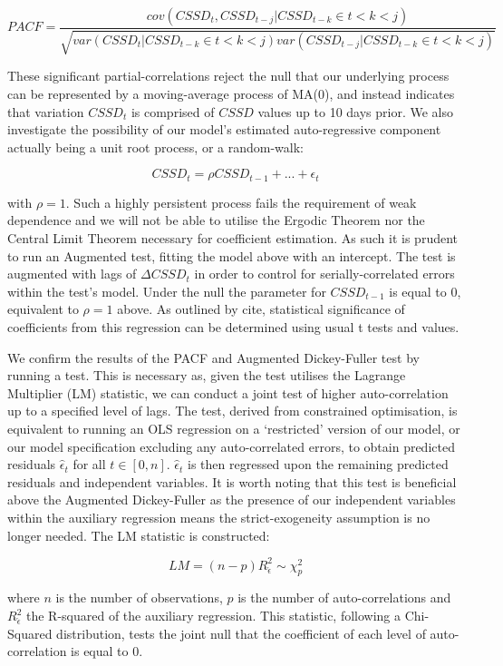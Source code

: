 \documentclass[12pt]{article}
\begin{document}
$$
PACF=\frac{cov(CSSD_t,CSSD_{t-j}|CSSD_{t-k}\in{t<k<j})}{\sqrt{var(CSSD_t|CSSD_{t-k}\in{t<k<j})var(CSSD_{t-j}|CSSD_{t-k}\in{t<k<j})}}
$$

These significant partial-correlations reject the null that our underlying process can be represented by a moving-average process of MA(0), and instead indicates that variation $CSSD_t$ is comprised of $CSSD$ values up to 10 days prior. We also investigate the possibility of our model’s estimated auto-regressive component actually being a unit root process, or a random-walk:

$$
CSSD_t=\rho{CSSD_{t-1}}+...+\epsilon_t
$$

with $\rho=1$. Such a highly persistent process fails the requirement of weak dependence and we will not be able to utilise the Ergodic Theorem nor the Central Limit Theorem necessary for coefficient estimation. As such it is prudent to run an Augmented \citet{dfuller} test, fitting the model above with an intercept. The test is augmented with lags of $\Delta{CSSD_t}$ in order to control for serially-correlated errors within the test’s model. Under the null the parameter for $CSSD_{t-1}$ is equal to 0, equivalent to $\rho=1$ above. As outlined by cite, statistical significance of coefficients from this regression can be determined using usual t tests and values.

We confirm the results of the PACF and Augmented Dickey-Fuller test by running a \citet{breusch} \citet{godfrey} test. This is necessary as, given the test utilises the Lagrange Multiplier (LM) statistic, we can conduct a joint test of higher auto-correlation up to a specified level of lags. The test, derived from constrained optimisation, is equivalent to running an OLS regression on a ‘restricted’ version of our model, or our model specification excluding any auto-correlated errors, to obtain predicted residuals $\hat{\epsilon}_t$ for all $t\in[0,n]$. $\hat{\epsilon}_t$ is then regressed upon the remaining predicted residuals and independent variables. It is worth noting that this test is beneficial above the Augmented Dickey-Fuller as the presence of our independent variables within the auxiliary regression means the strict-exogeneity assumption is no longer needed. The LM statistic is constructed:

$$
LM=(n-p)R^2_{\hat{\epsilon}} \sim\chi^2_p
$$

where $n$ is the number of observations, $p$ is the number of auto-correlations and $R^2_{\hat{\epsilon}}$ the R-squared of the auxiliary regression. This statistic, following a Chi-Squared distribution, tests the joint null that the coefficient of each level of auto-correlation is equal to 0.
\end{document}
